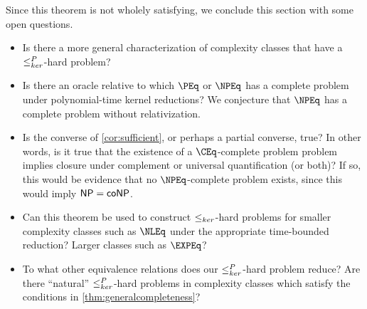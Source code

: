 Since this theorem is not wholely satisfying, we conclude this section with some open questions.
\begin{itemize}
\item Is there a more general characterization of complexity classes that have a $\leq^{P}_{ker}$-hard problem?
\item
  Is there an oracle relative to which $\PEq$ or $\NPEq$ has a complete problem under polynomial-time kernel reductions?
  We conjecture that $\NPEq$ has a complete problem without relativization.
\item
  Is the converse of \autoref{cor:sufficient}, or perhaps a partial converse, true?
  In other words, is it true that the existence of a $\CEq$-complete problem problem implies closure under complement or universal quantification (or both)?
  If so, this would be evidence that no $\NPEq$-complete problem exists, since this would imply ${\mathsf{NP}} = {\mathsf{coNP}}$.
\item
  Can this theorem be used to construct $\leq_{ker}$-hard problems for smaller complexity classes such as $\NLEq$ under the appropriate time-bounded reduction?
  Larger classes such as $\EXPEq$?
\item
  To what other equivalence relations does our $\leq^{P}_{ker}$-hard problem reduce?
  Are there ``natural'' $\leq^{P}_{ker}$-hard problems in complexity classes which satisfy the conditions in \autoref{thm:generalcompleteness}?
\end{itemize}
